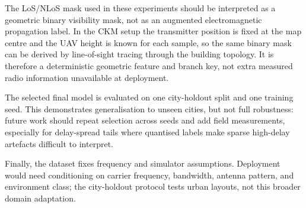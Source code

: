The LoS/NLoS mask used in these experiments should be interpreted as a
geometric binary visibility mask, not as an augmented electromagnetic
propagation label. In the CKM setup the transmitter position is fixed at the
map centre and the UAV height is known for each sample, so the same binary mask
can be derived by line-of-sight tracing through the building topology. It is
therefore a deterministic geometric feature and branch key, not extra measured
radio information unavailable at deployment.

The selected final model is evaluated on one city-holdout split and one
training seed. This demonstrates generalisation to unseen cities, but not full
robustness: future work should repeat selection across seeds and add field
measurements, especially for delay-spread tails where quantised labels make
sparse high-delay artefacts difficult to interpret.

Finally, the dataset fixes frequency and simulator assumptions. Deployment
would need conditioning on carrier frequency, bandwidth, antenna pattern, and
environment class; the city-holdout protocol tests urban layouts, not this
broader domain adaptation.
